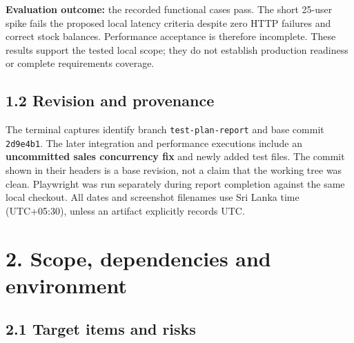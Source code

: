 \documentclass[
  11pt,
]{article}
\begin{document}
\textbf{Evaluation outcome:} the recorded functional cases pass. The
short 25-user spike fails the proposed local latency criteria despite
zero HTTP failures and correct stock balances. Performance acceptance is
therefore incomplete. These results support the tested local scope; they
do not establish production readiness or complete requirements coverage.

\subsection{1.2 Revision and provenance}\label{revision-and-provenance}

The terminal captures identify branch \texttt{test-plan-report} and base
commit \texttt{2d9e4b1}. The later integration and performance
executions include an \textbf{uncommitted sales concurrency fix} and
newly added test files. The commit shown in their headers is a base
revision, not a claim that the working tree was clean. Playwright was
run separately during report completion against the same local checkout.
All dates and screenshot filenames use Sri Lanka time (UTC+05:30),
unless an artifact explicitly records UTC.

\section{2. Scope, dependencies and
environment}\label{scope-dependencies-and-environment}

\subsection{2.1 Target items and risks}\label{target-items-and-risks}
\end{document}
